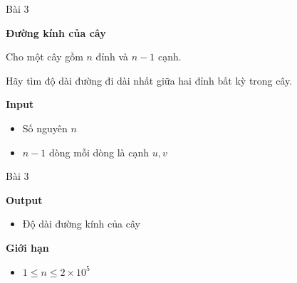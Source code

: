 \begin{frame}{Bài 3}

\begin{center}
\textbf{Đường kính của cây}
\end{center}

{\small
Cho một cây gồm $n$ đỉnh và $n-1$ cạnh.

Hãy tìm độ dài đường đi dài nhất giữa hai đỉnh bất kỳ trong cây.
}

\vspace{0.3cm}

\textbf{Input}
\begin{itemize}
\item Số nguyên $n$
\item $n-1$ dòng mỗi dòng là cạnh $u, v$
\end{itemize}

\end{frame}

\begin{frame}{Bài 3}

\textbf{Output}
\begin{itemize}
\item Độ dài đường kính của cây
\end{itemize}

\vspace{0.3cm}

\textbf{Giới hạn}
\begin{itemize}
\item $1 \le n \le 2 \times 10^5$
\end{itemize}

\end{frame}

